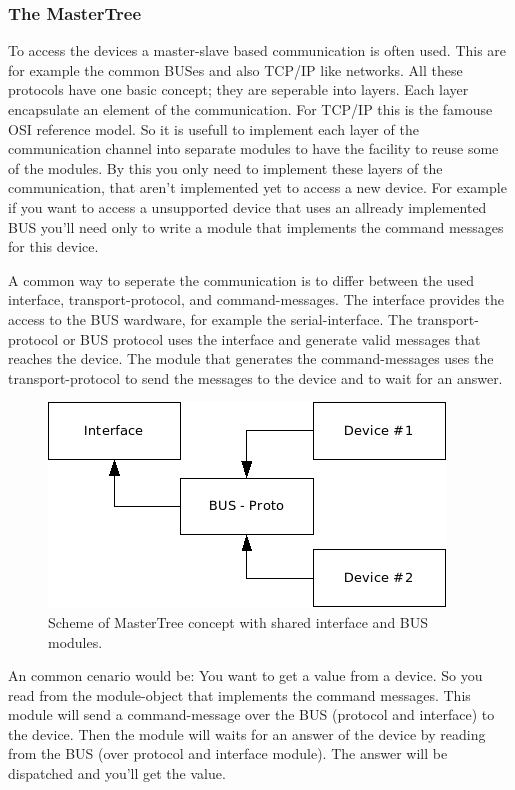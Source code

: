 \subsubsection{The MasterTree}
To access the devices a master-slave based communication is often used. This are 
for example the common BUSes and also TCP/IP like networks. All these protocols
have one basic concept; they are seperable into layers. Each layer encapsulate 
an element of the communication.  For TCP/IP this is the famouse OSI reference 
model. So it is usefull to implement each layer of the communication channel
into separate modules to have the facility to reuse some of the modules. By
this you only need to implement these layers of the communication, that aren't
implemented yet to access a new device. For example if you want to access
a unsupported device that uses an allready implemented BUS you'll need only
to write a module that implements the command messages for this device.

A common way to seperate the communication is to differ between the used
interface, transport-protocol, and command-messages. The interface provides
the access to the BUS wardware, for example the serial-interface. The 
transport-protocol or BUS protocol uses the interface and generate valid 
messages that reaches the device. The module that generates the 
command-messages uses the transport-protocol to send the messages to the
device and to wait for an answer.  

\begin{figure}[ht]
    \centering
    \label{fig:cMasterTree}
    \includegraphics[scale=1]{cMasterTree.png}
    \caption{Scheme of MasterTree concept with shared interface and BUS modules.}
\end{figure}

An common cenario would be: You want to get a value from a device. So
you read from the module-object that implements the command messages.
This module will send a command-message over the BUS (protocol and interface)
to the device. Then the module will waits for an answer of the device
by reading from the BUS (over protocol and interface module). The
answer will be dispatched and you'll get the value.

